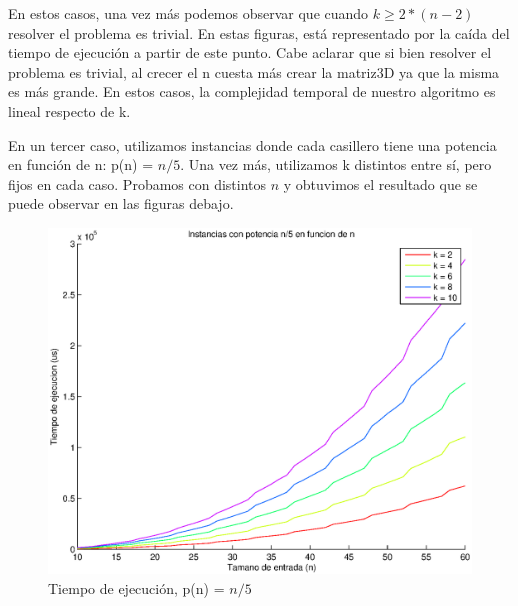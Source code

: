 En estos casos, una vez más podemos observar que cuando $k \geq 2*(n-2)$ resolver el problema es trivial. En estas figuras, está representado por la caída del tiempo de ejecución a partir de este punto. Cabe aclarar que si bien resolver el problema es trivial, al crecer el n cuesta más crear la matriz3D ya que la misma es más grande. En estos casos, la complejidad temporal de nuestro algoritmo es lineal respecto de k.


En un tercer caso, utilizamos instancias donde cada casillero tiene una potencia en función de n: p(n) = $n/5$. Una vez más, utilizamos k distintos entre sí, pero fijos en cada caso. Probamos con distintos $n$ y obtuvimos el resultado que se puede observar en las figuras debajo.

\begin{figure}[H]
  \begin{minipage}{0.5\linewidth}
    \includegraphics[width=\linewidth]{img/problema3/instancia_p_20p_varios_k.eps}
    \caption{Tiempo de ejecución, p(n) = $n/5$}\label{fig:problema3-k-20}
  \end{minipage}
  \hfill
  \begin{minipage}{0.5\linewidth}

\end{minipage}
\end{figure}
